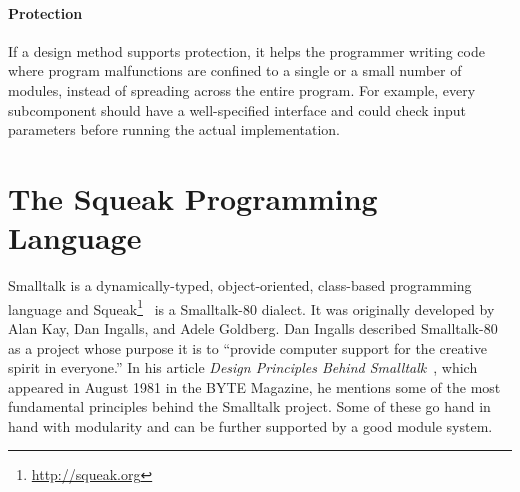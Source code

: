 \paragraph{Protection}
If a design method supports protection, it helps the programmer writing code where program malfunctions are confined to a single or a small number of modules, instead of spreading across the entire program. For example, every subcomponent should have a well-specified interface and could check input parameters before running the actual implementation.

\section{The Squeak Programming Language}
\label{sec:intro_squeak_prog}
Smalltalk is a dynamically-typed, object-oriented, class-based programming language and Squeak\footnote{\url{http://squeak.org}}~\cite{Ingalls:1997:BFS:263698.263754} is a Smalltalk-80 dialect. It was originally developed by Alan Kay, Dan Ingalls, and Adele Goldberg. Dan Ingalls described Smalltalk-80 as a project whose purpose it is to ``provide computer support for the creative spirit in everyone.'' In his article \emph{Design Principles Behind Smalltalk}~\cite{Inga81a}, which appeared in August 1981 in the BYTE Magazine, he mentions some of the most fundamental principles behind the Smalltalk project. Some of these go hand in hand with modularity and can be further supported by a good module system.


